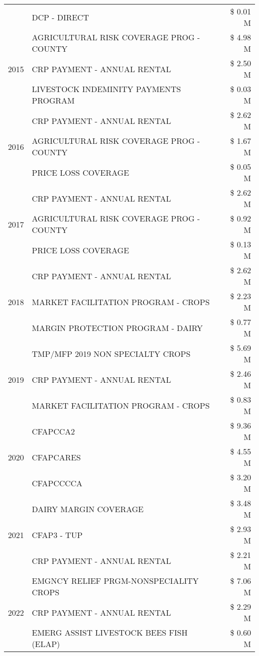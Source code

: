 \begin{tabular}{llr}
 & DCP - DIRECT & \$ 0.01 M \\
\cline{1-3}
\multirow[t]{3}{*}{2015} & AGRICULTURAL RISK COVERAGE PROG - COUNTY & \$ 4.98 M \\
 & CRP PAYMENT - ANNUAL RENTAL & \$ 2.50 M \\
 & LIVESTOCK INDEMINITY PAYMENTS PROGRAM & \$ 0.03 M \\
\cline{1-3}
\multirow[t]{3}{*}{2016} & CRP PAYMENT - ANNUAL RENTAL & \$ 2.62 M \\
 & AGRICULTURAL RISK COVERAGE PROG - COUNTY & \$ 1.67 M \\
 & PRICE LOSS COVERAGE & \$ 0.05 M \\
\cline{1-3}
\multirow[t]{3}{*}{2017} & CRP PAYMENT - ANNUAL RENTAL & \$ 2.62 M \\
 & AGRICULTURAL RISK COVERAGE PROG - COUNTY & \$ 0.92 M \\
 & PRICE LOSS COVERAGE & \$ 0.13 M \\
\cline{1-3}
\multirow[t]{3}{*}{2018} & CRP PAYMENT - ANNUAL RENTAL & \$ 2.62 M \\
 & MARKET FACILITATION PROGRAM - CROPS & \$ 2.23 M \\
 & MARGIN PROTECTION PROGRAM - DAIRY & \$ 0.77 M \\
\cline{1-3}
\multirow[t]{3}{*}{2019} & TMP/MFP 2019 NON SPECIALTY CROPS & \$ 5.69 M \\
 & CRP PAYMENT - ANNUAL RENTAL & \$ 2.46 M \\
 & MARKET FACILITATION PROGRAM - CROPS & \$ 0.83 M \\
\cline{1-3}
\multirow[t]{3}{*}{2020} & CFAPCCA2 & \$ 9.36 M \\
 & CFAPCARES & \$ 4.55 M \\
 & CFAPCCCCA & \$ 3.20 M \\
\cline{1-3}
\multirow[t]{3}{*}{2021} & DAIRY MARGIN COVERAGE & \$ 3.48 M \\
 & CFAP3 - TUP & \$ 2.93 M \\
 & CRP PAYMENT - ANNUAL RENTAL & \$ 2.21 M \\
\cline{1-3}
\multirow[t]{3}{*}{2022} & EMGNCY RELIEF PRGM-NONSPECIALITY CROPS & \$ 7.06 M \\
 & CRP PAYMENT - ANNUAL RENTAL & \$ 2.29 M \\
 & EMERG ASSIST LIVESTOCK BEES FISH (ELAP) & \$ 0.60 M \\
\cline{1-3}
\bottomrule
\end{tabular}
